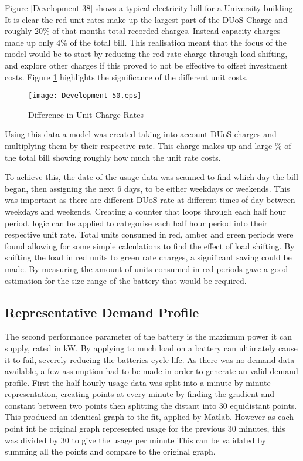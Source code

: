 Figure \ref{Development-38} shows a typical electricity bill for a
University building. It is clear the red unit rates make up the largest
part of the DUoS Charge and roughly 20\% of that months total recorded
charges. Instead capacity charges made up only 4\% of the total bill.
This realisation meant that the focus of the model would be to start by
reducing the red rate charge through load shifting, and explore other
charges if this proved to not be effective to offset investment costs.
Figure \ref{Development-50} highlights the significance of the different
unit costs.

\begin{figure}[H]
 \centering
 \texttt{[image: Development-50.eps]}
 \caption{Difference in Unit Charge Rates}
 \label{Development-50}
 \end{figure}

Using this data a model was created taking into account DUoS charges and
multiplying them by their respective rate. This charge makes up and
large \% of the total bill showing roughly how much the unit rate costs.

To achieve this, the date of the usage data was scanned to find which
day the bill began, then assigning the next 6 days, to be either
weekdays or weekends. This was important as there are different DUoS
rate at different times of day between weekdays and weekends. Creating a
counter that loops through each half hour period, logic can be applied
to categorise each half hour period into their respective unit rate.
Total units consumed in red, amber and green periods were found allowing
for some simple calculations to find the effect of load shifting. By
shifting the load in red units to green rate charges, a significant
saving could be made. By measuring the amount of units consumed in red
periods gave a good estimation for the size range of the battery that
would be required.

\subsection{Representative Demand
Profile}\label{representative-demand-profile}

The second performance parameter of the battery is the maximum power it
can supply, rated in kW. By applying to much load on a battery can
ultimately cause it to fail, severely reducing the batteries cycle life.
As there was no demand data available, a few assumption had to be made
in order to generate an valid demand profile. First the half hourly
usage data was split into a minute by minute representation, creating
points at every minute by finding the gradient and constant between two
points then splitting the distant into 30 equidistant points. This
produced an identical graph to the fit, applied by Matlab. However as
each point int he original graph represented usage for the previous 30
minutes, this was divided by 30 to give the usage per minute This can be
validated by summing all the points and compare to the original graph.


